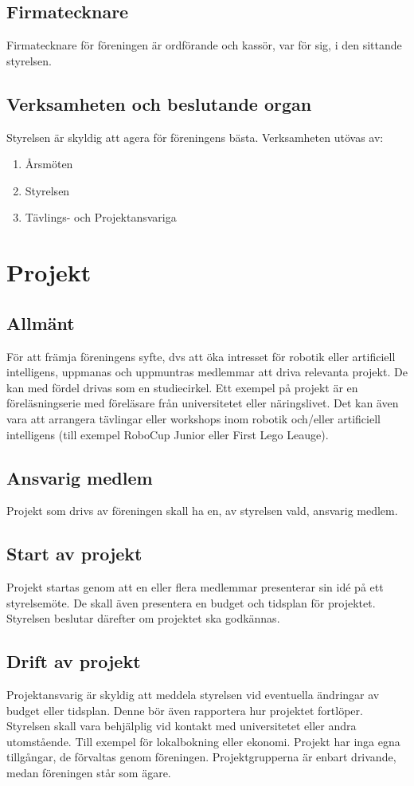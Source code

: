 \documentclass[11pt,a4paper]{article}
\begin{document}
\subsection{Firmatecknare}
Firmatecknare för föreningen är ordförande och kassör, var för sig, i den
sittande styrelsen. 
\subsection{Verksamheten och beslutande organ}
Styrelsen är skyldig att agera för föreningens bästa. Verksamheten utövas av:
\begin{enumerate}
\item Årsmöten
\item Styrelsen
\item Tävlings- och Projektansvariga
\end{enumerate}


\section{Projekt}

\subsection{Allmänt}
För att främja föreningens syfte, dvs att öka intresset för robotik eller
artificiell intelligens, uppmanas och uppmuntras medlemmar att driva
relevanta projekt. De kan med fördel drivas som en studiecirkel. Ett
exempel på projekt är en föreläsningserie med föreläsare från universitetet
eller näringslivet. Det kan även vara att arrangera tävlingar eller
workshops inom robotik och/eller artificiell intelligens (till exempel
RoboCup Junior eller First Lego Leauge).

\subsection{Ansvarig medlem}
Projekt som drivs av föreningen skall ha en, av styrelsen vald, ansvarig medlem.

\subsection{Start av projekt}
Projekt startas genom att en eller flera medlemmar presenterar sin idé på
ett styrelsemöte. De skall även presentera en budget och tidsplan för
projektet. Styrelsen beslutar därefter om projektet ska godkännas.

\subsection{Drift av projekt}
Projektansvarig är skyldig att meddela styrelsen vid eventuella ändringar
av budget eller tidsplan. Denne bör även rapportera hur projektet
fortlöper. Styrelsen skall vara behjälplig vid kontakt med universitetet
eller andra utomstående. Till exempel för lokalbokning eller ekonomi.
Projekt har inga egna tillgångar, de förvaltas genom föreningen.
Projektgrupperna är enbart drivande, medan föreningen står som ägare.
\end{document}
